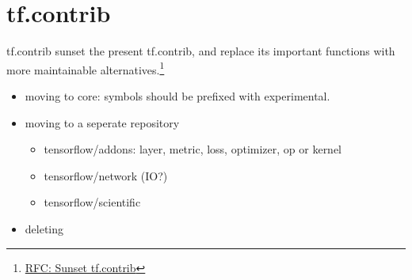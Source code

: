 
\section{tf.contrib}

\begin{frame}{tf.contrib}
    sunset the present tf.contrib, and replace its important functions with more maintainable alternatives.\footnote{\href{https://github.com/tensorflow/community/pull/18}{RFC: Sunset tf.contrib}}

    \begin{itemize}
        \item moving to core: symbols should be prefixed with experimental.
        \item moving to a seperate repository
            \begin{itemize}
                \item tensorflow/addons: layer, metric, loss, optimizer, op or kernel
                \item tensorflow/network (IO?)
                \item tensorflow/scientific
            \end{itemize}
        \item deleting
    \end{itemize}
\end{frame}
